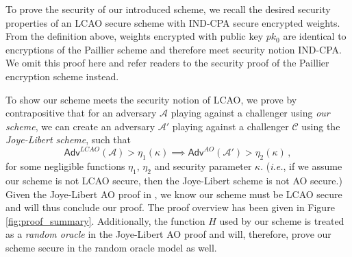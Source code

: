 \documentclass[10pt,letterpaper,oneside,twocolumn,journal]{IEEEtran}
\theoremstyle{definition}
\theoremstyle{definition}
\theoremstyle{remark}
\begin{document}

To prove the security of our introduced scheme, we recall the desired security properties of an LCAO secure scheme with IND-CPA secure encrypted weights. From the definition above, weights encrypted with public key $pk_0$ are identical to encryptions of the Paillier scheme and therefore meet security notion IND-CPA. We omit this proof here and refer readers to the security proof of the Paillier encryption scheme \cite{paillierPublicKeyCryptosystemsBased1999} instead.

To show our scheme meets the security notion of LCAO, we prove by contrapositive that for an adversary $\mathcal{A}$ playing against a challenger using \textit{our scheme}, we can create an adversary $\mathcal{A}'$ playing against a challenger $\mathcal{C}$ using the \textit{Joye-Libert scheme}, such that
\begin{equation*}
    \mathsf{Adv}^{LCAO}(\mathcal{A}) > \eta_1(\kappa) \implies \mathsf{Adv}^{AO}(\mathcal{A}') > \eta_2(\kappa)\,,
\end{equation*}
for some negligible functions $\eta_1$, $\eta_2$ and security parameter $\kappa$. (\textit{i.e.}, if we assume our scheme is not LCAO secure, then the Joye-Libert scheme is not AO secure.) Given the Joye-Libert AO proof in \cite{joyeScalableSchemePrivacyPreserving2013}, we know our scheme must be LCAO secure and will thus conclude our proof. The proof overview has been given in Figure \ref{fig:proof_summary}. Additionally, the function $H$ used by our scheme is treated as a \textit{random oracle} in the Joye-Libert AO proof and will, therefore, prove our scheme secure in the random oracle model as well.
\end{document}
